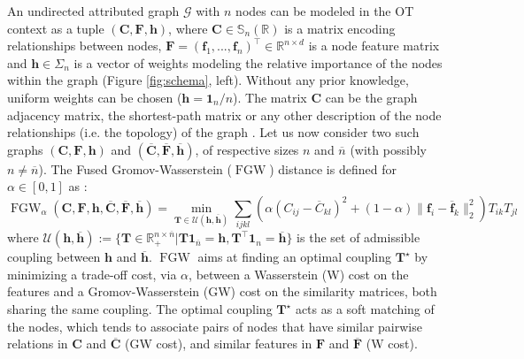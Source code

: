 \documentclass{article}
\def\vf{{\bm{f}}}
\def\vh{{\bm{h}}}
\def\mC{{\bm{C}}}
\def\mF{{\bm{F}}}
\def\mT{{\bm{T}}}
\def\sR{{\mathbb{R}}}
\def\sS{{\mathbb{S}}}
\newcommand{\R}{\mathbb{R}}
\newcommand{\FGW}{\operatorname{FGW}}
\begin{document}
An undirected attributed graph $\mathcal{G}$ with $n$ nodes can be modeled in
the OT context as a tuple $(\mC, \mF, \vh)$, where $\mC \in \sS_n(\sR)$ is a
matrix encoding relationships between nodes, $\mF = (\vf_1,..., \vf_n)^\top \in
\R^{n \times d}$ is a node feature matrix and $\vh \in \Sigma_n$ is a vector of
weights modeling the relative importance of the nodes within the graph (Figure
\ref{fig:schema}, left). Without any prior knowledge, uniform weights can be chosen
($\vh = \bm{1}_{n} / n$). The matrix $\mC$ can be the graph adjacency matrix,
the shortest-path matrix or any other description of the node relationships
(i.e. the topology) of the graph \cite{peyre2016gromov, vayer2020fused,
chowdhury2021generalized}. Let us now consider two such graphs $(\mC, \mF, \vh)$
and $(\overline{\mC}, \overline{\mF}, \overline{\vh})$, of respective sizes $n$
and $\overline{n}$ (with possibly $n \neq \overline{n}$). The Fused
Gromov-Wasserstein ($\FGW$) distance is defined for $\alpha \in [0, 1]$ as
\cite{vayer2020fused, titouan2019optimal}:
\begin{equation} \label{eq:FGW}
	\FGW_{\alpha}(\mC, \mF, \vh, \overline{\mC}, \overline{\mF}, \overline{\vh}) = \min_{\mT \in \mathcal{U}(\vh, \overline{\vh})} \sum_{ijkl} \left( \alpha (C_{ij} - \overline{C}_{kl})^2 + (1 -\alpha) \| \vf_i - \overline{\vf}_k \|_2^2 \right) T_{ik} T_{jl}
\end{equation}
where $\mathcal{U}(\vh, \overline{\vh}) := \{\mT \in \R_+^{n \times
\overline{n}} | \mT \bm{1}_{\overline{n}} = \vh, \mT^\top \bm{1}_n =
\overline{\vh}\}$ is the set of admissible coupling between $\vh$ and
$\overline{\vh}$. $\FGW$ aims at finding an optimal coupling $\mT^{\star}$ by minimizing a trade-off cost, via $\alpha$, between a Wasserstein (W)
cost on the features and a Gromov-Wasserstein (GW) cost on the similarity matrices, both sharing the same coupling. The
optimal coupling $\mT^{\star}$ acts as a soft matching of the nodes, which tends to
associate pairs of nodes that have similar pairwise relations in $\mC$ and
$\overline{\mC}$ (GW cost), and similar features in $\mF$ and $\overline{\mF}$
(W cost). 
\end{document}
